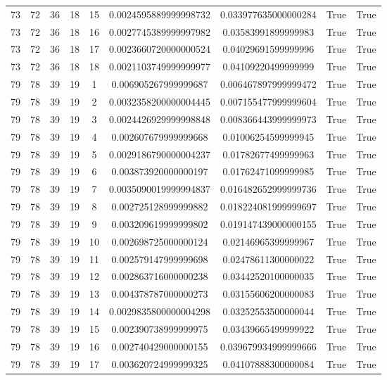 \documentclass[a4paper,11pt]{article}
\begin{document}
\begin{landscape}
\begin{longtable}{ccccccccc}
73 & 72 & 36 & 18 & 15 & 0.0024595889999998732 & 0.033977635000000284 & True & True \\
73 & 72 & 36 & 18 & 16 & 0.0027745389999997982 & 0.03583991899999983 & True & True \\
73 & 72 & 36 & 18 & 17 & 0.0023660720000000524 & 0.04029691599999996 & True & True \\
73 & 72 & 36 & 18 & 18 & 0.0021103749999999977 & 0.04109220499999999 & True & True \\
79 & 78 & 39 & 19 & 1 & 0.006905267999999687 & 0.006467897999999472 & True & True \\
79 & 78 & 39 & 19 & 2 & 0.0032358200000004445 & 0.007155477999999604 & True & True \\
79 & 78 & 39 & 19 & 3 & 0.0024426929999998848 & 0.008366443999999973 & True & True \\
79 & 78 & 39 & 19 & 4 & 0.002607679999999668 & 0.01006254599999945 & True & True \\
79 & 78 & 39 & 19 & 5 & 0.0029186790000004237 & 0.01782677499999963 & True & True \\
79 & 78 & 39 & 19 & 6 & 0.003873920000000197 & 0.01762471099999985 & True & True \\
79 & 78 & 39 & 19 & 7 & 0.0035090019999994837 & 0.016482652999999736 & True & True \\
79 & 78 & 39 & 19 & 8 & 0.002725128999999882 & 0.018224081999999697 & True & True \\
79 & 78 & 39 & 19 & 9 & 0.003209619999999802 & 0.019147439000000155 & True & True \\
79 & 78 & 39 & 19 & 10 & 0.002698725000000124 & 0.02146965399999967 & True & True \\
79 & 78 & 39 & 19 & 11 & 0.002579147999999698 & 0.02478611300000022 & True & True \\
79 & 78 & 39 & 19 & 12 & 0.002863716000000238 & 0.03442520100000035 & True & True \\
79 & 78 & 39 & 19 & 13 & 0.004378787000000273 & 0.03155606200000083 & True & True \\
79 & 78 & 39 & 19 & 14 & 0.0029835800000004298 & 0.03252553500000044 & True & True \\
79 & 78 & 39 & 19 & 15 & 0.002390738999999975 & 0.03439665499999922 & True & True \\
79 & 78 & 39 & 19 & 16 & 0.002740429000000155 & 0.039679934999999666 & True & True \\
79 & 78 & 39 & 19 & 17 & 0.003620724999999325 & 0.04107888300000084 & True & True \\

\end{longtable}
\end{landscape}
\end{document}
